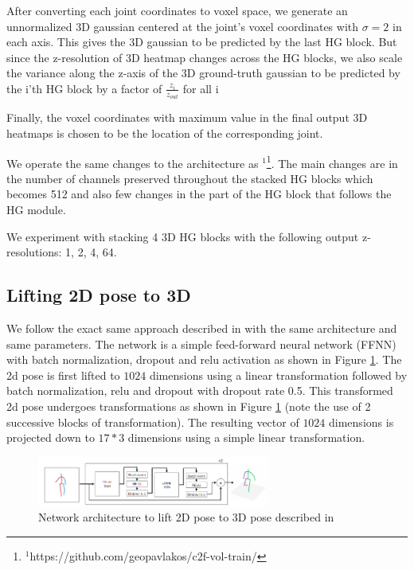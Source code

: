 \documentclass[sigconf]{acmart}
\begin{document}
After converting each joint coordinates to voxel space, we generate an unnormalized 3D gaussian centered at the joint's voxel coordinates with $\sigma=2$ in each axis. This gives the 3D gaussian to be predicted by the last HG block. But since the z-resolution of 3D heatmap changes across the HG blocks, we also scale the variance along the z-axis of the 3D ground-truth gaussian to be predicted by the i'th HG block by a factor of $\frac{z_i}{z_{out}}$ for all i

Finally, the voxel coordinates with maximum value in the final output 3D heatmaps is chosen to be the location of the corresponding joint.

We operate the same changes to the architecture as \cite{pavlakos}$^1$\footnote{$^1$https://github.com/geopavlakos/c2f-vol-train/}. The main changes are in the number of channels preserved throughout the stacked HG blocks which becomes 512 and also few changes in the part of the HG block that follows the HG module.

We experiment with stacking 4 3D HG blocks with the following output z-resolutions: 1, 2, 4, 64.
\subsection{Lifting 2D pose to 3D}
We follow the exact same approach described in \cite{martinez} with the same architecture and same parameters. The network is a simple feed-forward neural network (FFNN) with batch normalization, dropout and relu activation as shown in Figure \ref{sb_arch}. The  2d pose is first lifted to $1024$ dimensions using a linear transformation followed by batch normalization, relu and dropout with dropout rate 0.5. This transformed 2d pose undergoes transformations as shown in Figure \ref{sb_arch} (note the use of 2 successive blocks of transformation). The resulting vector of $1024$ dimensions is projected down to $17*3$ dimensions using a simple linear transformation.

\begin{figure}
\includegraphics[height=0.75
in, width=3in]{img/sb_arch.png}
\caption{Network architecture to lift 2D pose to 3D pose described in \cite{martinez}}
\label{sb_arch}
\end{figure}
\end{document}
